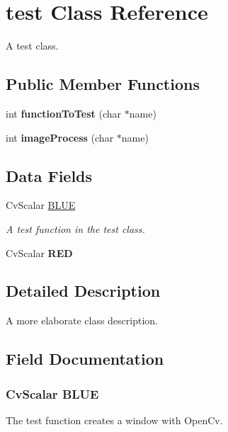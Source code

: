 \hypertarget{classtest}{
\section{test Class Reference}
\label{classtest}
}


A test class.  


\subsection*{Public Member Functions}
\begin{DoxyCompactItemize}
\item 
\hypertarget{classtest_a242ba2172d7754e4d356043e842f9859}{
int {\bfseries functionToTest} (char $\ast$name)}
\label{classtest_a242ba2172d7754e4d356043e842f9859}

\item 
\hypertarget{classtest_a7ffc392c9fc906c26497a831ae1afe7f}{
int {\bfseries imageProcess} (char $\ast$name)}
\label{classtest_a7ffc392c9fc906c26497a831ae1afe7f}

\end{DoxyCompactItemize}
\subsection*{Data Fields}
\begin{DoxyCompactItemize}
\item 
CvScalar \hyperlink{classtest_a8ae17e7465f2dcf6cc2eae18423da5f1}{BLUE}
\begin{DoxyCompactList}\small\item\em A test function in the test class. \item\end{DoxyCompactList}\item 
\hypertarget{classtest_a3e513ff358edab8f543845ede6d6813d}{
CvScalar {\bfseries RED}}
\label{classtest_a3e513ff358edab8f543845ede6d6813d}

\end{DoxyCompactItemize}


\subsection{Detailed Description}
A more elaborate class description. 

\subsection{Field Documentation}
\hypertarget{classtest_a8ae17e7465f2dcf6cc2eae18423da5f1}{
\subsubsection[{BLUE}]{\setlength{\rightskip}{0pt plus 5cm}CvScalar {\bf BLUE}}}
\label{classtest_a8ae17e7465f2dcf6cc2eae18423da5f1}
The test function creates a window with OpenCv. 